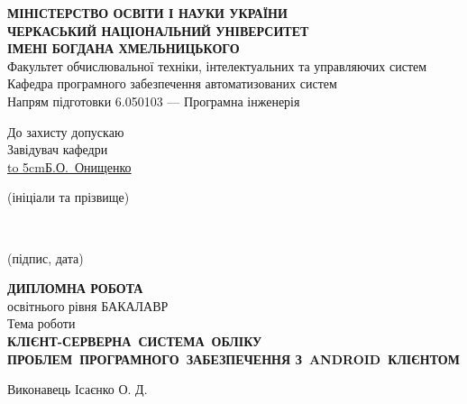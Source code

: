 \documentclass[../main.tex]{subfiles}
\begin{document}
\begin{titlepage}
    \centering
    {\bfseries
    \MakeUppercase{Міністерство освіти і науки України} \\
    \MakeUppercase{Черкаський національний університет} \\
    \MakeUppercase{імені Богдана Хмельницького} \\}
    Факультет обчислювальної техніки, інтелектуальних та управляючих систем \\
    Кафедра програмного забезпечення автоматизованих систем \\
    Напрям підготовки 6.050103 — Програмна інженерія \\
    \begin{flushright}
        \begin{minipage}[t]{5cm}
            \begin{flushright}
                До захисту допускаю \\
                Завідувач кафедри \\
                \underline{\hbox to 5cm{\hfill Б.О.~Онищенко \hfill}} \\
                \vspace{-0.125\baselineskip}
                {\footnotesize\centering (ініціали та прізвище)\par}
                \hrulefill \\
                \vspace{-0.375\baselineskip}
                {\footnotesize\centering (підпис, дата)\par}
            \end{flushright}
        \end{minipage}
    \end{flushright}
    \vfill
    {\large %
    {\scshape\bfseries \MakeUppercase{Дипломна робота} \\}
    освітнього рівня БАКАЛАВР \\
    Тема роботи \\
    {\scshape\bfseries \MakeUppercase{Клієнт-серверна~система~обліку проблем~програмного~забезпечення з~Android~клієнтом} \\}
    }
    \vfill
    {
	    \begin{flushright}
			\begin{minipage}[t]{4.2cm}
				\begin{flushright}
					Виконавець Ісаєнко О. Д. \\

\end{flushright}
\end{minipage}
\end{flushright}}
\end{titlepage}
\end{document}
